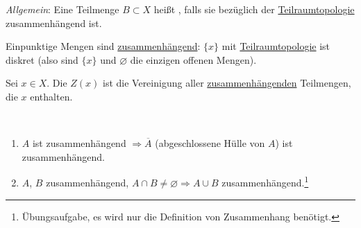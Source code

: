 \begin{remark}
  \emph{Allgemein}: Eine Teilmenge $ B \subset X $ heißt , falls sie bezüglich der \hyperref[def:teilraumtopologie]{Teilraumtopologie} zusammenhängend ist.
\end{remark}

\begin{remark}
  Einpunktige Mengen sind \hyperref[def:zusammenhaengend]{zusammenhängend}: $ \{ x \} $ mit \hyperref[def:teilraumtopologie]{Teilraumtopologie} ist diskret (also sind $ \{ x \} $ und $ \varnothing $ die einzigen offenen Mengen).
\end{remark}

\begin{definition}[Zusammenhangskomponente]
  \label{def:zusammenhangskomponente}
  Sei $ x \in X $. Die  $ Z(x) $ ist die Vereinigung aller \hyperref[def:zusammenhaengend]{zusammenhängenden} Teilmengen, die $ x $ enthalten.
\end{definition}

\begin{lemma}
  \
  \begin{enumerate}
    \item $ A $ ist zusammenhängend $ \Rightarrow \overline{A} $ (abgeschlossene Hülle von $ A $) ist zusammenhängend.
    \item $ A $, $ B $ zusammenhängend, $ A \cap B \neq \varnothing \Rightarrow A \cup B $ zusammenhängend.\footnote{Übungsaufgabe, es wird nur die Definition von Zusammenhang benötigt.} 
  \end{enumerate}
\end{lemma}

